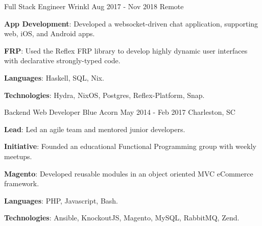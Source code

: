 \begin{cventries}
  \cventry
    {Full Stack Engineer}
    {Wrinkl}
    {Aug 2017 - Nov 2018}
    {Remote}
    {
      \begin{cvitems}
        \item {\color{graytext}\textbf{App Development}}: Developed a
          websocket-driven chat application, supporting
          web, iOS, and Android apps.
        \item {\color{graytext}\textbf{FRP}}: Used the Reflex FRP library to
          develop highly dynamic user interfaces with declarative strongly-typed
          code.
        \item {\color{graytext}\textbf{Languages}}: Haskell, SQL, Nix.
        \item {\color{graytext}\textbf{Technologies}}: Hydra, NixOS, Postgres,
          Reflex-Platform, Snap.
      \end{cvitems}
    }


  \cventry
    {Backend Web Developer} %
    {Blue Acorn} %
    {May 2014 - Feb 2017} %
    {Charleston, SC} %
    {
      \begin{cvitems} %
        \item {\color{graytext}\textbf{Lead}}: Led an agile team
          and mentored junior developers.
        \item {\color{graytext}\textbf{Initiative}}: Founded an
          educational Functional Programming group with weekly meetups.
        \item {\color{graytext}\textbf{Magento}}: Developed reusable modules in
          an object oriented MVC eCommerce framework.
        \item {\color{graytext}\textbf{Languages}}: PHP, Javascript, Bash.
        \item {\color{graytext}\textbf{Technologies}}: Ansible, KnockoutJS, Magento,
          MySQL, RabbitMQ, Zend.
      \end{cvitems}
    }

\end{cventries}
